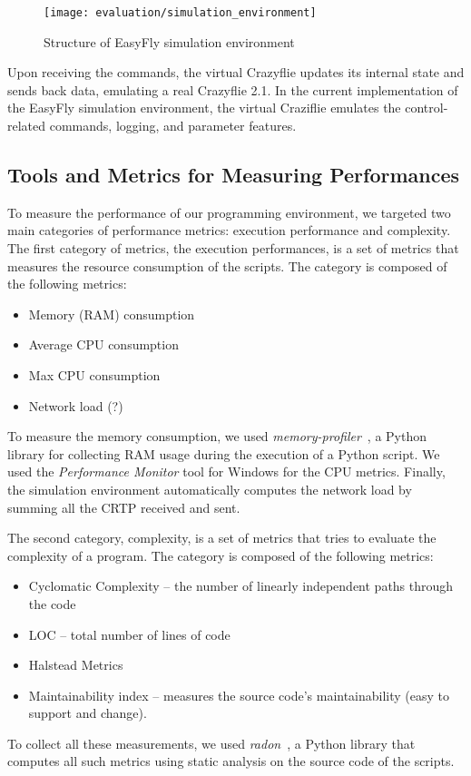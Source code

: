 \begin{SCfigure}[\sidecaptionrelwidth][h]
    \texttt{[image: evaluation/simulation\_environment]}
    \caption{Structure of EasyFly simulation environment}\label{fig:simulation_environment}
\end{SCfigure}

Upon receiving the commands, the virtual Crazyflie updates its internal state and sends back data, emulating a real Crazyflie 2.1.
In the current implementation of the EasyFly simulation environment, the virtual Craziflie emulates the control-related commands, logging, and parameter features.

\subsection{Tools and Metrics for Measuring Performances}\label{subsec:performance_metrics}

To measure the performance of our programming environment, we targeted two main categories of performance metrics: execution performance and complexity.
The first category of metrics, the execution performances, is a set of metrics that measures the resource consumption of the scripts.
The category is composed of the following metrics:
\begin{itemize}
    \item Memory (RAM) consumption
    \item Average CPU consumption 
    \item Max CPU consumption
    \item Network load (?) 
\end{itemize}

To measure the memory consumption, we used \textit{memory-profiler}~\cite{memoryProfiler}, a Python library for collecting RAM usage during the execution of a Python script.
We used the \textit{Performance Monitor} tool for Windows for the CPU metrics. 
Finally, the simulation environment automatically computes the network load by summing all the CRTP received and sent.

The second category, complexity, is a set of metrics that tries to evaluate the complexity of a program.
The category is composed of the following metrics:
\begin{itemize}
    \item Cyclomatic Complexity -- the number of linearly independent paths through the code
    \item LOC -- total number of lines of code
    \item Halstead Metrics 
    \item Maintainability index -- measures the source code's maintainability (easy to support and change).
\end{itemize}

To collect all these measurements, we used \textit{radon}~\cite{radon}, a Python library that computes all such metrics using static analysis on the source code of the scripts.